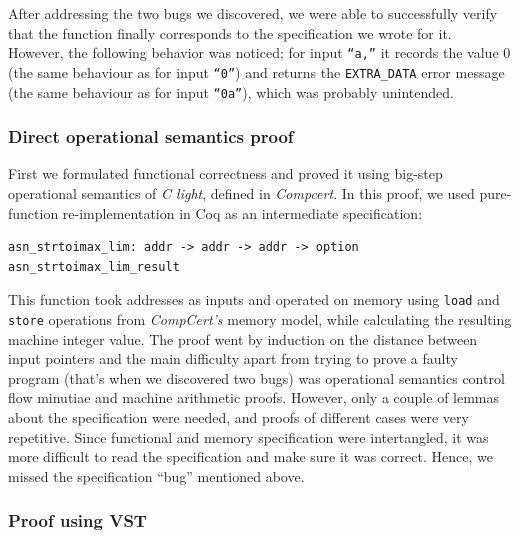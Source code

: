 \documentclass[10p,conference]{IEEEtran}
\begin{document}
After addressing the two bugs we discovered, we were able to
successfully verify that the function finally corresponds to the
specification we wrote for it. However, the following
behavior was noticed; for input \texttt{``a,''} it records the value $0$ (the same behaviour
as for input \texttt{``0''}) and returns the
\texttt{EXTRA\_DATA} error message (the same behaviour as for input
\texttt{``0a''}), which was probably unintended.
  
\subsubsection{Direct operational semantics proof}

First we formulated functional correctness and proved it using
big-step operational semantics of \textit{C light}, defined in
\textit{Compcert}. In this proof, we used pure-function
re-implementation in Coq as an intermediate specification:

\begin{lstlisting}[language=Coq]
asn_strtoimax_lim: addr -> addr -> addr -> option asn_strtoimax_lim_result
\end{lstlisting}

This function took addresses as inputs and operated on memory using
\texttt{load} and \texttt{store} operations from \textit{CompCert's}
memory model, while calculating the resulting machine integer
value. The proof went by induction on the distance between input
pointers and the main difficulty apart from trying to prove a faulty
program (that's when we discovered two bugs) was operational semantics
control flow minutiae and machine arithmetic proofs. However, only a
couple of lemmas about the specification were needed, and proofs of
different cases were very repetitive. Since functional and memory
specification were intertangled, it was more difficult to read the
specification and make sure it was correct. Hence, we missed the
specification ``bug'' mentioned above.

\subsubsection{Proof using VST}
\end{document}
